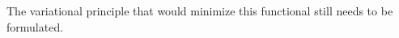 The variational principle that would minimize this functional still needs to be
formulated.








% 
